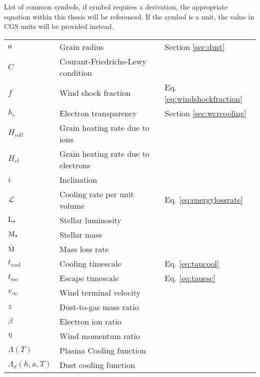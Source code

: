 \begin{Common_Symbols}

List of common symbols, if symbol requires a derivation, the appropriate equation within this thesis will be referenced. If the symbol is a unit, the value in CGS units will be provided instead. 

\begin{longtable}[c]{lll}
  \hline
  \endhead
  \hline
  \endfoot




  $a$ & Grain radius & Section \ref{sec:dust} \\
  $C$ & Courant-Friedrichs-Lewy condition & \\
  $f$ & Wind shock fraction & Eq. \ref{eq:windshockfraction} \\
  $h_e$ & Electron transparency & Section \ref{sec:wcrcooling} \\
  $H_{coll}$ & Grain heating rate due to ions & \\
  $H_{el}$ & Grain heating rate due to electrons & \\
  $i$ & Inclination & \\
  $\mathcal{L}$ & Cooling rate per unit volume & Eq. \ref{eq:energylossrate} \\ 
  $\text{L}_\star$ & Stellar luminosity & \\
  $\text{M}_\star$ & Stellar mass & \\
  $\dot{\text{M}}$ & Mass loss rate & \\
  $t_\text{cool}$ & Cooling timescale & Eq. \ref{eq:taucool} \\
  $t_\text{esc}$ & Escape timescale & Eq. \ref{eq:tauesc} \\
  $v_\infty$ & Wind terminal velocity & \\
  $z$ & Dust-to-gas mass ratio  & \\


  $\beta$ & Electron ion ratio & \\
  $\eta$ & Wind momentum ratio  & \\
  
  $\Lambda(T)$ & Plasma Cooling function & \\
  $\Lambda_d(h,a,T)$ & Dust cooling function & \\


\end{longtable}
\end{Common_Symbols}
